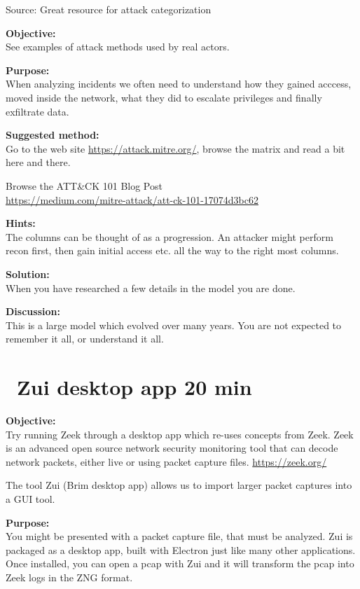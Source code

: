 \documentclass[a4paper,11pt,notitlepage]{report}
\begin{document}
Source:  Great resource for attack categorization



{\bf Objective:}\\
See examples of attack methods used by real actors.


{\bf Purpose:}\\
When analyzing incidents we often need to understand how they gained acccess, moved inside the network, what they did to escalate privileges and finally exfiltrate data.

{\bf Suggested method:}\\
Go to the web site \url{https://attack.mitre.org/}, browse the matrix and read a bit here and there.

Browse the ATT\&CK 101 Blog Post\\
\url{https://medium.com/mitre-attack/att-ck-101-17074d3bc62}


{\bf Hints:}\\
The columns can be thought of as a progression. An attacker might perform recon first, then gain initial access etc. all the way to the right most columns.

{\bf Solution:}\\
When you have researched a few details in the model you are done.

{\bf Discussion:}\\
This is a large model which evolved over many years. You are not expected to remember it all, or understand it all.



\chapter{\faInfoCircle\ Zui desktop app 20 min}
\label{ex:brim-security}


{\bf Objective:}\\
Try running Zeek through a desktop app which re-uses concepts from Zeek. Zeek is an advanced open source network security monitoring tool that can decode network packets, either live or using packet capture files. \url{https://zeek.org/}

The tool Zui (Brim desktop app) allows us to import larger packet captures into a GUI tool.

{\bf Purpose:}\\
You might be presented with a packet capture file, that must be analyzed. Zui is packaged as a desktop app, built with Electron just like many other applications. Once installed, you can open a pcap with Zui and it will transform the pcap into Zeek logs in the ZNG format.
\end{document}
